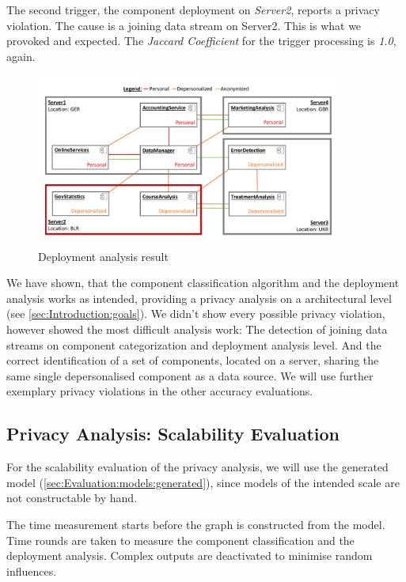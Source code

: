 The second trigger, the component deployment on \textit{Server2}, reports a privacy violation. The cause is a joining data stream on Server2. This is what we provoked and expected. The \textit{Jaccard Coefficient} for the trigger processing is \textit{1.0}, again.

\begin{figure}[h]
	\centering
	\includegraphics[trim = 0mm 10mm 0mm 10mm, clip, width=0.90\textwidth]{graphs/medSys_eval_pa_da}
	\caption{Deployment analysis result}
	\label{fig:eval:pa:depl_ana}
\end{figure}

We have shown, that the component classification algorithm and the deployment analysis works as intended, providing a privacy analysis on a architectural level (see \autoref{sec:Introduction:goals}). We didn't show every possible privacy violation, however showed the most difficult analysis work: The detection of joining data streams on component categorization and deployment analysis level. And the correct identification of a set of components, located on a server, sharing the same single depersonalised component as a data source. We will use further exemplary privacy violations in the other accuracy evaluations.

\subsection{Privacy Analysis: Scalability Evaluation}
\label{sec:Evaluation:privacyanalysis:scale}

For the scalability evaluation of the privacy analysis, we will use the generated model (\autoref{sec:Evaluation:models:generated}), since models of the intended scale are not constructable by hand.

The time measurement starts before the graph is constructed from the model. Time rounds are taken to measure the component classification and the deployment analysis. Complex outputs are deactivated to minimise random influences.

